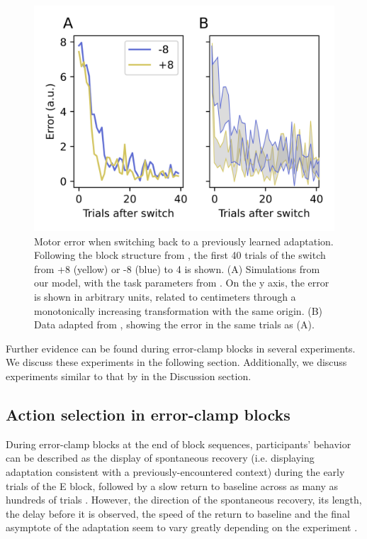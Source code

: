 \documentclass[a4paper,doc,floatsintext,natbib]{apa6}
\begin{document}
\begin{figure}
\centering
\includegraphics{./figures/figure_4.png}
\caption{Motor error when switching back to a previously learned adaptation. Following the block structure from \cite{Davidson_Scaling_2004}, the first 40 trials of the switch from +8 (yellow) or -8 (blue) to 4 is shown. (A) Simulations from our model, with the task parameters from \cite{Davidson_Scaling_2004}. On the y axis, the error is shown in arbitrary units, related to centimeters through a monotonically increasing transformation with the same origin. (B) Data adapted from \cite{Davidson_Scaling_2004}, showing the error in the same trials as (A).}
\label{fig:davidson-2004}
\end{figure}

Further evidence can be found during error-clamp blocks in several experiments. We discuss these experiments in the following section. Additionally, we discuss experiments similar to that by \cite{Davidson_Scaling_2004} in the Discussion section.


\subsection{Action selection in error-clamp blocks}
During error-clamp blocks at the end of block sequences, participants' behavior can be described as the display of spontaneous recovery (i.e. displaying adaptation consistent with a previously-encountered context) during the early trials of the E block, followed by a slow return to baseline across as many as hundreds of trials \citep{Brennan_Decay_2015}. However, the direction of the spontaneous recovery, its length, the delay before it is observed, the speed of the return to baseline and the final asymptote of the adaptation seem to vary greatly depending on the experiment \citep{Brennan_Decay_2015,Vaswani_Decay_2013,Smith_Interacting_2006,Shmuelof_Overcoming_2012}.
\end{document}
